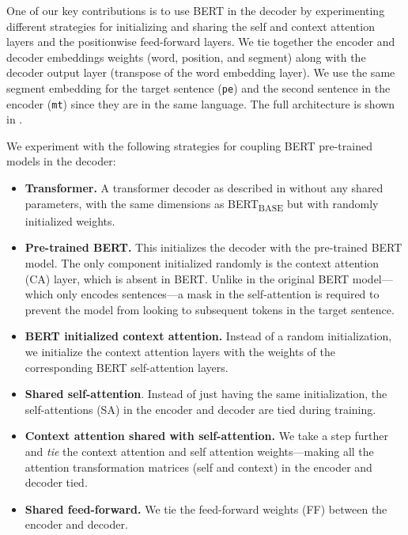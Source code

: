 One of our key contributions is to use BERT in the decoder by
experimenting different strategies for initializing and sharing the
self and context attention layers and the positionwise feed-forward
layers. We tie together the encoder and decoder embeddings weights
(word, position, and segment) along with the decoder output layer
(transpose of the word embedding layer). We use the same segment
embedding for the target sentence ({\tt pe}) and the second sentence
in the encoder ({\tt mt}) since they are in the same language. The
full architecture is shown in .

We experiment with the following strategies for coupling BERT
pre-trained models in the decoder:
%
\begin{itemize}
    \item \textbf{Transformer.} A transformer decoder as described in
          \citet{vaswani2017attention} without any shared parameters,
          with the same dimensions as BERT\textsubscript{BASE} but with randomly
          initialized weights.
    \item \textbf{Pre-trained BERT.} This initializes the decoder with
          the pre-trained BERT model. The only component initialized randomly
          is the context attention (CA) layer, which is absent in BERT. Unlike
          in the original BERT model---which only encodes sentences---a mask in
          the self-attention is required to prevent the model from looking to
          subsequent tokens in the target sentence.
    \item \textbf{ BERT initialized context attention.} Instead of a
          random initialization, we initialize the context attention layers
          with the weights of the corresponding BERT self-attention layers.
    \item \textbf{Shared self-attention}. Instead of just having the same
          initialization, the self-attentions (SA) in the encoder and decoder
          are tied during training.
    \item \textbf{Context attention shared with self-attention.} We take
          a step further and \emph{tie} the context attention and self
          attention weights---making all the attention transformation matrices
          (self and context) in the encoder and decoder tied.
    \item \textbf{Shared feed-forward.} We tie the feed-forward weights
          (FF) between the encoder and decoder.
\end{itemize}

